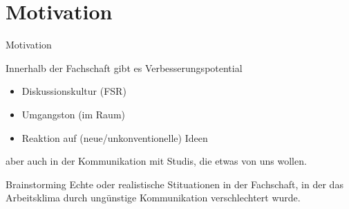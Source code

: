 \section{Motivation}

\begin{frame}[c]{Motivation}

	Innerhalb der Fachschaft gibt es Verbesserungspotential	
		
	\begin{itemize}[<+(1)->]
		\item Diskussionskultur (FSR)
		\item Umgangston (im Raum)
		\item Reaktion auf (neue/unkonventionelle) Ideen
	\end{itemize}

	aber auch in der Kommunikation mit Studis, die etwas von uns wollen.


	\begin{block}{Brainstorming}%
		Echte oder realistische Stituationen in der Fachschaft, in der das
		Arbeitsklima durch ungünstige Kommunikation verschlechtert wurde.
	\end{block}
\end{frame}

